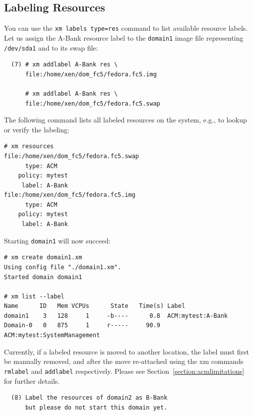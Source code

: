 \documentclass[11pt,twoside,final,openright]{report}
\begin{document}
\subsection{Labeling Resources}
\label{subsection:acmexamplelabelresources}
You can use the \verb|xm labels type=res| command to list available
resource labels. Let us assign the A-Bank resource label to the
\verb|domain1| image file representing \verb|/dev/sda1| and to its swap file:

\begin{verbatim}
  (7) # xm addlabel A-Bank res \
      file:/home/xen/dom_fc5/fedora.fc5.img

      # xm addlabel A-Bank res \
      file:/home/xen/dom_fc5/fedora.fc5.swap
\end{verbatim}

The following command lists all labeled resources on the system, e.g.,
to lookup or verify the labeling:

\begin{scriptsize}
\begin{verbatim}
# xm resources
file:/home/xen/dom_fc5/fedora.fc5.swap
      type: ACM
    policy: mytest
     label: A-Bank
file:/home/xen/dom_fc5/fedora.fc5.img
      type: ACM
    policy: mytest
     label: A-Bank
\end{verbatim}
\end{scriptsize}

Starting \verb|domain1| will now succeed:

\begin{scriptsize}
\begin{verbatim}
# xm create domain1.xm
Using config file "./domain1.xm".
Started domain domain1

# xm list --label
Name      ID   Mem VCPUs      State   Time(s) Label
domain1    3   128     1     -b----      0.8  ACM:mytest:A-Bank
Domain-0   0   875     1     r-----     90.9  ACM:mytest:SystemManagement
\end{verbatim}
\end{scriptsize}

Currently, if a labeled resource is moved to another location, the
label must first be manually removed, and after the move re-attached
using the xm commands \verb|rmlabel| and \verb|addlabel|
respectively.  Please see Section~\ref{section:acmlimitations} for
further details.

\begin{verbatim}
  (8) Label the resources of domain2 as B-Bank
      but please do not start this domain yet.
\end{verbatim}
\end{document}
